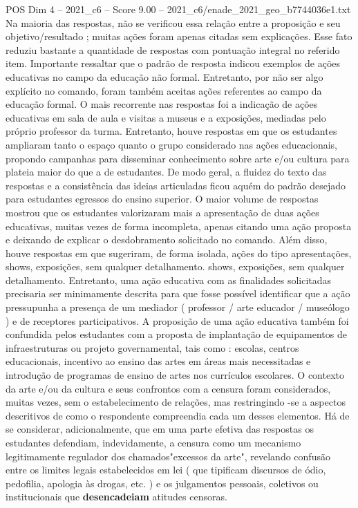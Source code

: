 \begin{textsample}{POS Dim 4 – 2021\_c6 – Score 9.00 – 2021\_c6/enade\_2021\_geo\_b7744036e1.txt}
Na maioria das respostas, não se verificou essa relação entre a proposição e seu objetivo/resultado ; muitas ações foram apenas citadas sem explicações.
Esse fato reduziu bastante a quantidade de respostas com pontuação integral no referido item.
Importante ressaltar que o padrão de resposta indicou exemplos de ações educativas no campo da educação não formal.
Entretanto, por não ser algo explícito no comando, foram também aceitas ações referentes ao campo da educação formal.
O mais recorrente nas respostas foi a indicação de ações educativas em sala de aula e visitas a museus e a exposições, mediadas pelo próprio professor da turma.
Entretanto, houve respostas em que os estudantes ampliaram tanto o espaço quanto o grupo considerado nas ações educacionais, propondo campanhas para disseminar conhecimento sobre arte e/ou cultura para plateia maior do que a de estudantes.
De modo geral, a fluidez do texto das respostas e a consistência das ideias articuladas ficou aquém do padrão desejado para estudantes egressos do ensino superior.
O maior volume de respostas mostrou que os estudantes valorizaram mais a apresentação de duas ações educativas, muitas vezes de forma incompleta, apenas citando uma ação proposta e deixando de explicar o desdobramento solicitado no comando.
Além disso, houve respostas em que sugeriram, de forma isolada, ações do tipo apresentações, shows, exposições, sem qualquer detalhamento. shows, exposições, sem qualquer detalhamento.
Entretanto, uma ação educativa com as finalidades solicitadas precisaria ser minimamente descrita para que fosse possível identificar que a ação pressupunha a presença de um mediador ( professor / arte educador / museólogo ) e de receptores participativos.
A proposição de uma ação educativa também foi confundida pelos estudantes com a proposta de implantação de equipamentos de infraestruturas ou projeto governamental, tais como : escolas, centros educacionais, incentivo ao ensino das artes em áreas mais necessitadas e introdução de programas de ensino de artes nos currículos escolares.
O contexto da arte e/ou da cultura e seus confrontos com a censura foram considerados, muitas vezes, sem o estabelecimento de relações, mas restringindo -se a aspectos descritivos de como o respondente compreendia cada um desses elementos.
Há de se considerar, adicionalmente, que em uma parte efetiva das respostas os estudantes defendiam, indevidamente, a censura como um mecanismo legitimamente regulador dos chamados"excessos da arte", revelando confusão entre os limites legais estabelecidos em lei ( que tipificam discursos de ódio, pedofilia, apologia às drogas, etc. ) e os julgamentos pessoais, coletivos ou institucionais que \textbf{desencadeiam} atitudes censoras.

\end{textsample}
